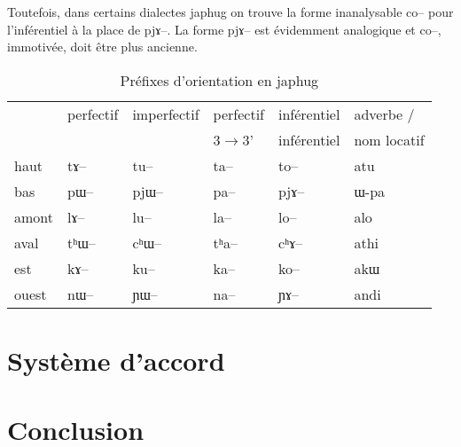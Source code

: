 \documentclass[oldfontcommands,oneside,a4paper,11pt]{article}
\newcommand{\ipa}[1]{{\phon \mbox{#1}}} %
\begin{document}
Toutefois, dans certains dialectes japhug on trouve la forme inanalysable \ipa{co--} pour l'inférentiel à la place de \ipa{pjɤ--}. La forme \ipa{pjɤ--} est évidemment analogique et \ipa{co--}, immotivée, doit être plus ancienne.

\begin{table}[H]
\caption{Préfixes d'orientation en japhug} \label{tab:orientation}
\begin{tabular}{llllll}
\toprule
   &  	perfectif &  	imperfectif  &  	perfectif   &  	inférentiel  & adverbe / \\  	
  &  	  &  	   &  	  3$\rightarrow$3'  &  	inférentiel  & nom locatif\\  	
   \midrule
haut   &  	\ipa{tɤ--}   &  	\ipa{tu--}   &  	\ipa{ta--}   &  	\ipa{to--}  & \ipa{atu} \\  	
bas   &  	\ipa{pɯ--}   &  	\ipa{pjɯ--}   &  	\ipa{pa--}   &  	\ipa{pjɤ--}  &\ipa{ɯ-pa} \\  	
amont   &  	\ipa{lɤ--}   &  	\ipa{lu--}   &  	\ipa{la--}   &  	\ipa{lo--}  & \ipa{alo}  \\  	
aval   &  	\ipa{tʰɯ--}   &  	\ipa{cʰɯ--}   &  	\ipa{tʰa--}   &  	\ipa{cʰɤ--} & \ipa{athi}  \\  	
est   &  	\ipa{kɤ--}   &  	\ipa{ku--}   &  	\ipa{ka--}   &  	\ipa{ko--}  & \ipa{akɯ}  \\  	
ouest   &  	\ipa{nɯ--}   &  	\ipa{ɲɯ--}   &  	\ipa{na--}   &  	\ipa{ɲɤ--}  & \ipa{andi}  \\  	
\bottomrule
\end{tabular} 
\end{table}

\section{Système d'accord}

\citealt{jacques12agreement}


\section{Conclusion}
  


\end{document}
